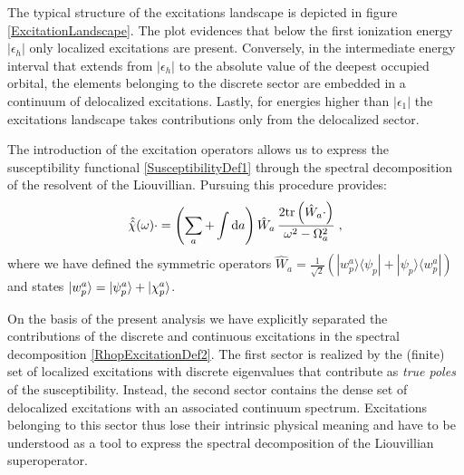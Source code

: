 \documentclass[reprint,aps,prb]{revtex4-1}
\newcommand{\dd}{{\rm d}}
\newcommand{\eps}{\epsilon}
\newcommand{\be}{\begin{equation}}
\newcommand{\ee}{\end{equation}}
\newcommand{\lb}{\label}
\newcommand{\op}[1]{\hat {#1}}
\newcommand{\sop}[1]{\op{\op {#1}}}
\newcommand{\trace}[1]{\mathrm{tr}\left(#1\right)}
\newcommand{\ketbra}[2]{| #1 \rangle \langle #2 |}
\begin{document}
The typical structure of the excitations landscape is depicted in figure \ref{ExcitationLandscape}. The plot evidences that below the first ionization energy $|\eps_h|$ only localized excitations are 
present. Conversely, in the intermediate energy interval that extends from $|\eps_h|$ to the absolute value of the deepest occupied orbital, the elements belonging to the discrete sector are embedded 
in a continuum of delocalized excitations. Lastly, for energies higher than $|\eps_1|$ the excitations landscape takes contributions only from the delocalized sector. 

The introduction of the excitation operators allows us to express the susceptibility functional \eqref{SusceptibilityDef1} through the spectral decomposition of the resolvent of the 
Liouvillian. Pursuing this procedure provides:
\be\lb{RhopExcitationDef2}
\sop{{\cal \chi}}(\omega) \cdot   = \left(\sum_a + \int\dd a   \right) \op W_{a} \,
\frac{2\trace{\op W_a \cdot}}{\omega^2-\Omega_a^2} \;,
\ee 
where we have defined the symmetric operators $\op W_a = \frac{1}{\sqrt{2}}(\ketbra{w_p^a}{\psi_p}+\ketbra{\psi_p}{w_p^a})$ and states $\ket{w_p^a}=\ket{\psi_p^a}+\ket{\chi_p^a}$.

On the basis of the present analysis we have explicitly separated the contributions of the discrete and continuous excitations in the spectral decomposition \eqref{RhopExcitationDef2}. 
The first sector is realized by the (finite) set of localized excitations with discrete eigenvalues that contribute as \emph{true poles} of the susceptibility. 
Instead, the second sector contains the dense set of delocalized excitations with an associated continuum spectrum. Excitations belonging to this sector thus lose their intrinsic physical meaning 
and have to be understood as a tool to express the spectral decomposition of the Liouvillian superoperator. 

\end{document}
